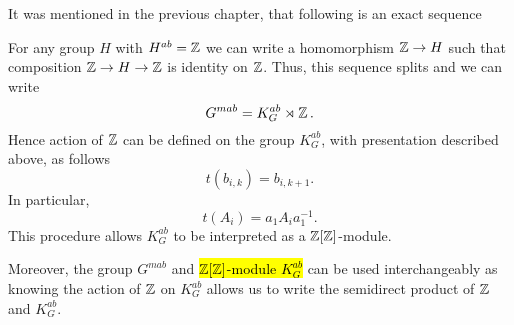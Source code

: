 It was mentioned in the previous chapter, that following is an exact sequence
\begin{center}
\end{center}
For any group $H$ with $H^{ab}=\operatorname{\mathbb{Z}}$ we can write a homomorphism $\operatorname{\mathbb{Z}}\to H$ such that composition $\operatorname{\mathbb{Z}}\to H\to \operatorname{\mathbb{Z}}$ is identity on $\operatorname{\mathbb{Z}}$. Thus, this sequence splits and we can write 
$$G^{mab}=K^{ab}_G\rtimes \operatorname{\mathbb{Z}}.$$ 
Hence action of $\operatorname{\mathbb{Z}}$ can be defined on the group $K^{ab}_G$, with presentation described above, as follows 
$$t(b_{i, k})=b_{i, k+1}.$$
In particular, 
$$t(A_i)=a_1 A_i a_1^{-1}.$$
This procedure allows $K_G^{ab}$ to be interpreted as a $\operatorname{\mathbb{Z}}[\operatorname{\mathbb{Z}}]$-module.

Moreover, the group $G^{mab}$ and \hl{$\operatorname{\mathbb{Z}}[\operatorname{\mathbb{Z}}]$-module $K_G^{ab}$} can be used interchangeably as knowing the action of $\operatorname{\mathbb{Z}}$ on $K_G^{ab}$ allows us to write the semidirect product of $\operatorname{\mathbb{Z}}$ and $K_G^{ab}$.

%





